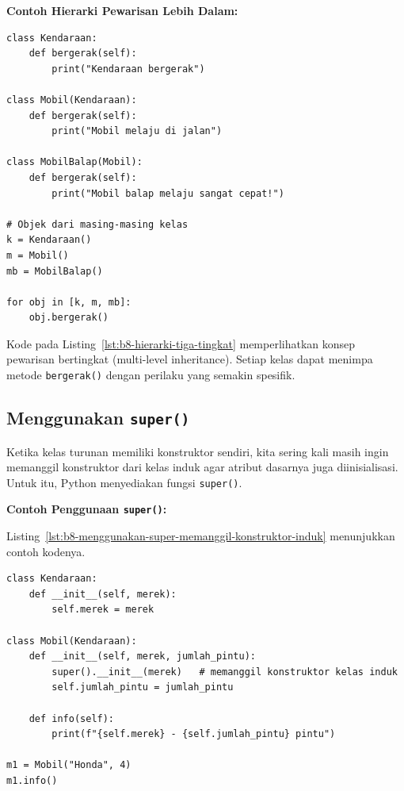 \noindent\textbf{Contoh Hierarki Pewarisan Lebih Dalam:}

\begin{lstlisting}[style=PythonStyle, caption={Hierarki Tiga Tingkat}, label={lst:b8-hierarki-tiga-tingkat}]
class Kendaraan:
    def bergerak(self):
        print("Kendaraan bergerak")

class Mobil(Kendaraan):
    def bergerak(self):
        print("Mobil melaju di jalan")

class MobilBalap(Mobil):
    def bergerak(self):
        print("Mobil balap melaju sangat cepat!")

# Objek dari masing-masing kelas
k = Kendaraan()
m = Mobil()
mb = MobilBalap()

for obj in [k, m, mb]:
    obj.bergerak()
\end{lstlisting}

Kode pada Listing~\ref{lst:b8-hierarki-tiga-tingkat} memperlihatkan konsep pewarisan bertingkat (multi-level inheritance).  
Setiap kelas dapat menimpa metode \texttt{bergerak()} dengan perilaku yang semakin spesifik.

\subsection{Menggunakan \texttt{super()}}

Ketika kelas turunan memiliki konstruktor sendiri, kita sering kali masih ingin memanggil konstruktor dari kelas induk agar atribut dasarnya juga diinisialisasi.  
Untuk itu, Python menyediakan fungsi \texttt{super()}.

\noindent\textbf{Contoh Penggunaan \texttt{super()}:}

Listing~\ref{lst:b8-menggunakan-super-memanggil-konstruktor-induk} menunjukkan contoh kodenya.

\begin{lstlisting}[style=PythonStyle, caption={Menggunakan super() untuk Memanggil Konstruktor Induk}, label={lst:b8-menggunakan-super-memanggil-konstruktor-induk}]
class Kendaraan:
    def __init__(self, merek):
        self.merek = merek

class Mobil(Kendaraan):
    def __init__(self, merek, jumlah_pintu):
        super().__init__(merek)   # memanggil konstruktor kelas induk
        self.jumlah_pintu = jumlah_pintu

    def info(self):
        print(f"{self.merek} - {self.jumlah_pintu} pintu")

m1 = Mobil("Honda", 4)
m1.info()
\end{lstlisting}

